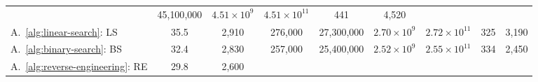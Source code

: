 \begin{table}[ht]
\begin{tabular}{l c c c c c c c c}
& 45{,}100{,}000\hspace{0.45em}{\scriptsize [44{,}500{,}000, 45{,}700{,}000]}
& $4.51\times10^{9}$\hspace{0.45em}{\scriptsize [$4.45\times10^{9}$, $4.57\times10^{9}$]}
& $4.51\times10^{11}$\hspace{0.45em}{\scriptsize [$4.45\times10^{11}$, $4.57\times10^{11}$]}
& 441\hspace{0.45em}{\scriptsize [436, 447]}
& 4{,}520\hspace{0.45em}{\scriptsize [4{,}460, 4{,}580]} \\
A.~\ref{alg:linear-search}: LS
& 35.5\hspace{0.45em}{\scriptsize [34.9, 36]}
& 2{,}910\hspace{0.45em}{\scriptsize [2{,}860, 2{,}960]}
& 276{,}000\hspace{0.45em}{\scriptsize [272{,}000, 280{,}000]}
& 27{,}300{,}000\hspace{0.45em}{\scriptsize [26{,}900{,}000, 27{,}700{,}000]}
& $2.70\times10^{9}$\hspace{0.45em}{\scriptsize [$2.67\times10^{9}$, $2.74\times10^{9}$]}
& $2.72\times10^{11}$\hspace{0.45em}{\scriptsize [$2.69\times10^{11}$, $2.76\times10^{11}$]}
& 325\hspace{0.45em}{\scriptsize [321, 329]}
& 3{,}190\hspace{0.45em}{\scriptsize [3{,}150, 3{,}240]} \\
A.~\ref{alg:binary-search}: BS
& 32.4\hspace{0.45em}{\scriptsize [32, 32.9]}
& 2{,}830\hspace{0.45em}{\scriptsize [2{,}800, 2{,}870]}
& 257{,}000\hspace{0.45em}{\scriptsize [254{,}000, 261{,}000]}
& 25{,}400{,}000\hspace{0.45em}{\scriptsize [25{,}000{,}000, 25{,}700{,}000]}
& $2.52\times10^{9}$\hspace{0.45em}{\scriptsize [$2.48\times10^{9}$, $2.55\times10^{9}$]}
& $2.55\times10^{11}$\hspace{0.45em}{\scriptsize [$2.53\times10^{11}$, $2.58\times10^{11}$]}
& 334\hspace{0.45em}{\scriptsize [330, 338]}
& 2{,}450\hspace{0.45em}{\scriptsize [2{,}420, 2{,}480]} \\
A.~\ref{alg:reverse-engineering}: RE
& 29.8\hspace{0.45em}{\scriptsize [29.2, 30.3]}
& 2{,}600\hspace{0.45em}{\scriptsize [2{,}570, 2{,}630]}

\end{tabular}
\end{table}
